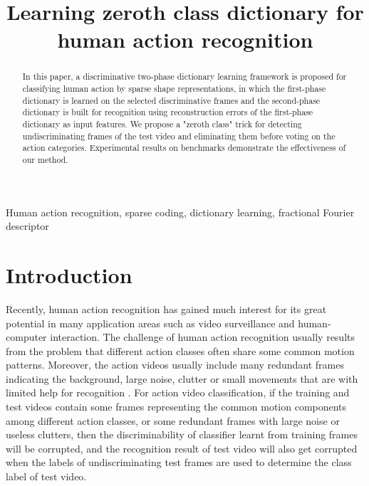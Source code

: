 \documentclass{article}
\title{Learning zeroth class dictionary for human action recognition}
\begin{document}
%
\maketitle
%
\begin{abstract}
 In this paper, a discriminative two-phase dictionary learning framework is proposed for classifying human action  by sparse shape representations, in which the first-phase dictionary is learned on the selected discriminative frames and the second-phase dictionary is built for recognition using reconstruction errors of the first-phase dictionary as input features.
 We  propose a "zeroth class" trick for detecting undiscriminating frames of the test video and eliminating them before voting on the action categories.
   Experimental results on benchmarks demonstrate  the effectiveness  of our method.
\end{abstract}
%
\begin{keywords}
Human action recognition, sparse coding, dictionary learning, fractional Fourier descriptor
\end{keywords}
%
\section{Introduction}




Recently, human action recognition has gained much interest for its great  potential in many application areas such as video surveillance and human-computer interaction.
The challenge of human action recognition usually results from the problem that different action classes often share some common motion patterns.
Moreover, the action videos usually include many redundant frames indicating the background, large noise, clutter or small movements that are with limited help for recognition \cite{cai2013human}.
For action video classification, if the training and test videos contain some frames representing the common motion components among different action classes, or some redundant frames  with large noise or useless clutters, then the discriminability of  classifier learnt from training frames will be corrupted, and the recognition result of test video will also get corrupted when the labels of undiscriminating  test frames are used to determine the class label of test video.
\end{document}

